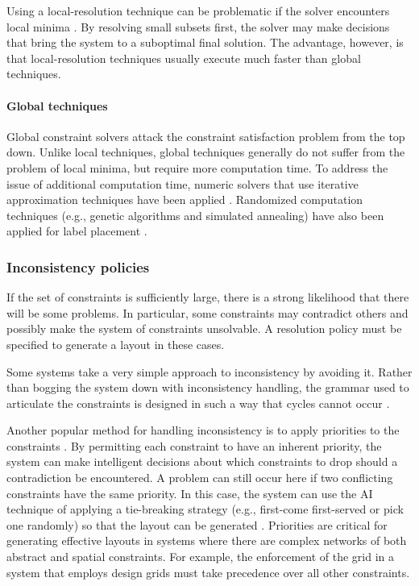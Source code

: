       Using a local-resolution technique can be problematic if the solver
      encounters local minima \citep{borning-2}. By resolving small subsets
      first, the solver may make decisions that bring the system to a suboptimal
      final solution. The advantage, however, is that local-resolution techniques
      usually execute much faster than global techniques.

     \paragraph{Global techniques}

      Global constraint solvers attack the constraint satisfaction problem from
      the top down. Unlike local techniques, global techniques generally do not
      suffer from the problem of local minima, but require more computation time.
      To address the issue of additional computation time, numeric solvers that
      use iterative approximation techniques have been applied
      \citep{kurlander-1}. Randomized computation techniques (e.g., genetic
      algorithms and simulated annealing) have also been applied for label
      placement \citep{christensen-2}.

    \subsubsection{Inconsistency policies}

     If the set of constraints is sufficiently large, there is a strong
     likelihood that there will be some problems. In particular, some
     constraints may contradict others and possibly make the system of
     constraints unsolvable. A resolution policy must be specified to generate a
     layout in these cases.

     Some systems take a very simple approach to inconsistency by avoiding it.
     Rather than bogging the system down with inconsistency handling, the
     grammar used to articulate the constraints is designed in such a way that
     cycles cannot occur \citep{weitzman-2}.

     Another popular method for handling inconsistency is to apply priorities to
     the constraints \citep{graf-1}. By permitting each constraint to have an
     inherent priority, the system can make intelligent decisions about which
     constraints to drop should a contradiction be encountered. A problem can
     still occur here if two conflicting constraints have the same priority. In
     this case, the system can use the AI technique of applying a tie-breaking
     strategy (e.g., first-come first-served or pick one randomly) so that the
     layout can be generated \citep{nilsson-1}. Priorities are critical for
     generating effective layouts in systems where there are complex networks of
     both abstract and spatial constraints. For example, the enforcement of the
     grid in a system that employs design grids must take precedence over all
     other constraints.

